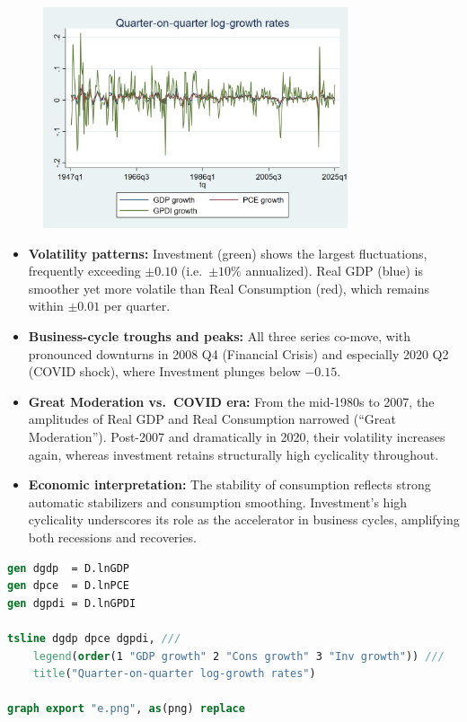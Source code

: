\documentclass[a4paper,12pt]{article} %
\theoremstyle{nonitalic}
\newenvironment{solution}[1]
  {\renewcommand\theinnercustomsol{#1}%
   \innercustomsol}
  {\endinnercustomsol}
\newcounter{solutionctr}[section]
\renewcommand{\thesolutionctr}{(\alph{solutionctr})}
\newenvironment{autosolution}
  {\refstepcounter{solutionctr}%
   \begin{solution}{\thesolutionctr}}
  {\end{solution}}
\begin{document}
\begin{autosolution}
    \

    \begin{figure}[ht]
        \centering
        \includegraphics[width=0.8\textwidth]{e.png}
    \end{figure}
    \begin{itemize}
        \item \textbf{Volatility patterns:}  
            Investment (green) shows the largest fluctuations, frequently exceeding $\pm0.10$ (i.e.\ $\pm10\%$ annualized).  
             Real GDP (blue) is smoother yet more volatile than Real Consumption (red), which remains within $\pm0.01$ per quarter.
        \item \textbf{Business-cycle troughs and peaks:}  
            All three series co-move, with pronounced downturns in 2008 Q4 (Financial Crisis) and especially 2020 Q2 (COVID shock), where Investment plunges below $-0.15$.
        \item \textbf{Great Moderation vs.\ COVID era:}  
            From the mid-1980s to 2007, the amplitudes of Real GDP and Real Consumption narrowed (“Great Moderation”).  
            Post-2007 and dramatically in 2020, their volatility increases again, whereas investment retains structurally high cyclicality throughout.
        \item \textbf{Economic interpretation:}  
            The stability of consumption reflects strong automatic stabilizers and consumption smoothing.  
            Investment's high cyclicality underscores its role as the accelerator in business cycles, amplifying both recessions and recoveries.
    \end{itemize}
    \begin{lstlisting}[language=Stata]
gen dgdp  = D.lnGDP
gen dpce  = D.lnPCE
gen dgpdi = D.lnGPDI

tsline dgdp dpce dgpdi, ///
    legend(order(1 "GDP growth" 2 "Cons growth" 3 "Inv growth")) ///
    title("Quarter-on-quarter log-growth rates")

graph export "e.png", as(png) replace
    \end{lstlisting}
\end{autosolution}
\end{document}
